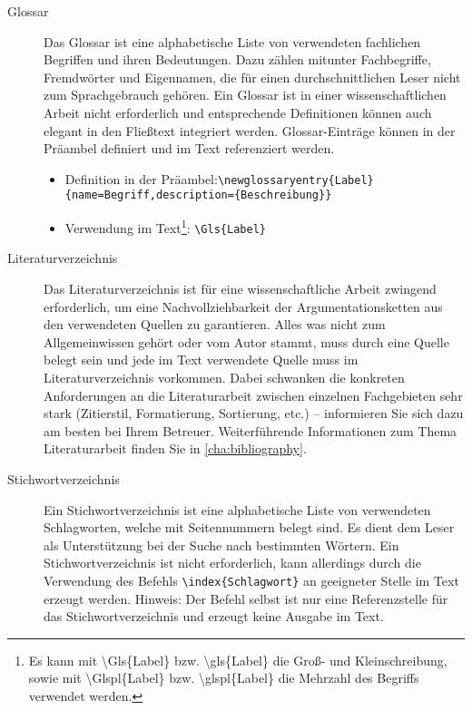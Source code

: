 \documentclass[
%
	thesis=paper,		%
	compactlistof,		%
	noauthorship,		%
%
	fancy,				%
%
%
]{hsmw-thesis}
\begin{document}
\begin{description}
		\item[Glossar]\label{itm:glossary}
		Das Glossar ist eine alphabetische Liste von verwendeten fachlichen Begriffen und ihren Bedeutungen.
		Dazu zählen mitunter Fachbegriffe, Fremdwörter und Eigennamen, die für einen durchschnittlichen Leser nicht zum Sprachgebrauch gehören.
		Ein Glossar ist in einer wissenschaftlichen Arbeit nicht erforderlich und entsprechende Definitionen können auch elegant in den Fließtext integriert werden.
		Glossar-Einträge können in der Präambel definiert und im Text referenziert werden.
		\begin{itemize}
			\item Definition in der Präambel:\newline\verb|\newglossaryentry{Label}{name=Begriff,description={Beschreibung}}|
			\item Verwendung im Text\footnote{\label{ftn:glossaryCommands}Es kann mit \textbackslash{}Gls\{Label\} bzw. \textbackslash{}gls\{Label\} die Groß- und Kleinschreibung, sowie mit \textbackslash{}Glspl\{Label\} bzw. \textbackslash{}glspl\{Label\} die Mehrzahl des Begriffs verwendet werden.}: \verb|\Gls{Label}|
		\end{itemize}
		
		\item[Literaturverzeichnis]\label{itm:bibliography}
		Das Literaturverzeichnis ist für eine wissenschaftliche Arbeit zwingend erforderlich, um eine Nachvollziehbarkeit der Argumentationsketten aus den verwendeten Quellen zu garantieren.
		Alles was nicht zum Allgemeinwissen gehört oder vom Autor stammt, muss durch eine Quelle belegt sein und jede im Text verwendete Quelle muss im Literaturverzeichnis vorkommen.
		Dabei schwanken die konkreten Anforderungen an die Literaturarbeit zwischen einzelnen Fachgebieten sehr stark (Zitierstil, Formatierung, Sortierung, etc.) -- informieren Sie sich dazu am besten bei Ihrem Betreuer.
		Weiterführende Informationen zum Thema Literaturarbeit finden Sie in \cref{cha:bibliography}.
		
		\item[Stichwortverzeichnis]\label{itm:index}
		Ein Stichwortverzeichnis ist eine alphabetische Liste von verwendeten Schlagworten, welche mit Seitennummern belegt sind.
		Es dient dem Leser als Unterstützung bei der Suche nach bestimmten Wörtern.
		Ein Stichwortverzeichnis ist nicht erforderlich, kann allerdings durch die Verwendung des Befehls \verb|\index{Schlagwort}| an geeigneter Stelle im Text erzeugt werden.
		Hinweis: Der Befehl selbst ist nur eine Referenzstelle für das Stichwortverzeichnis und erzeugt keine Ausgabe im Text.
		

\end{description}
\end{document}
